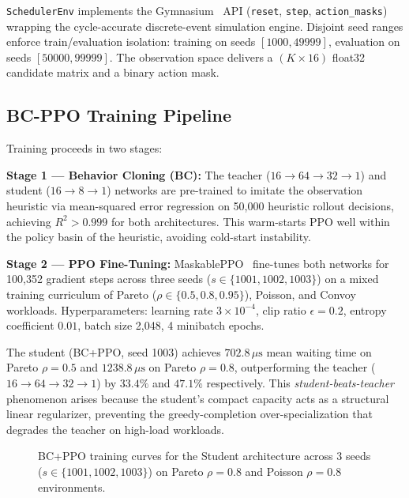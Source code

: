 \texttt{SchedulerEnv} implements the Gymnasium~\cite{Gymnasium2023} API
(\texttt{reset}, \texttt{step}, \texttt{action\_masks}) wrapping the
cycle-accurate discrete-event simulation engine. Disjoint seed ranges enforce
train/evaluation isolation: training on seeds $[1000, 49999]$, evaluation on
seeds $[50000, 99999]$. The observation space delivers a
$(K \times 16)$ float32 candidate matrix and a binary action mask.

\subsection{BC-PPO Training Pipeline}
\label{subsec:training}

Training proceeds in two stages:

\textbf{Stage 1 --- Behavior Cloning (BC):} The teacher ($16\to 64\to 32\to 1$)
and student ($16\to 8\to 1$) networks are pre-trained to imitate the
observation heuristic via mean-squared error regression on 50{,}000 heuristic
rollout decisions, achieving $R^2 > 0.999$ for both architectures. This
warm-starts PPO well within the policy basin of the heuristic, avoiding cold-start
instability.

\textbf{Stage 2 --- PPO Fine-Tuning:} MaskablePPO~\cite{Huang2022} fine-tunes
both networks for 100{,}352 gradient steps across three seeds
($s \in \{1001, 1002, 1003\}$) on a mixed training curriculum of Pareto
($\rho \in \{0.5, 0.8, 0.95\}$), Poisson, and Convoy workloads.
Hyperparameters: learning rate $3 \times 10^{-4}$, clip ratio $\epsilon = 0.2$,
entropy coefficient $0.01$, batch size 2{,}048, 4 minibatch epochs.

The student (BC+PPO, seed 1003) achieves $702.8\,\mu\text{s}$ mean waiting
time on Pareto $\rho = 0.5$ and $1238.8\,\mu\text{s}$ on Pareto $\rho = 0.8$,
outperforming the teacher ($16\to 64\to 32\to 1$) by $33.4\%$ and
$47.1\%$ respectively. This \emph{student-beats-teacher} phenomenon arises
because the student's compact capacity acts as a structural linear regularizer,
preventing the greedy-completion over-specialization that degrades the teacher
on high-load workloads.

\begin{figure}[t]
  \centering
  \caption{BC+PPO training curves for the Student architecture across 3 seeds ($s \in \{1001, 1002, 1003\}$) on Pareto $\rho = 0.8$ and Poisson $\rho = 0.8$ environments.}
  \label{fig:learning_curves}
\end{figure}

